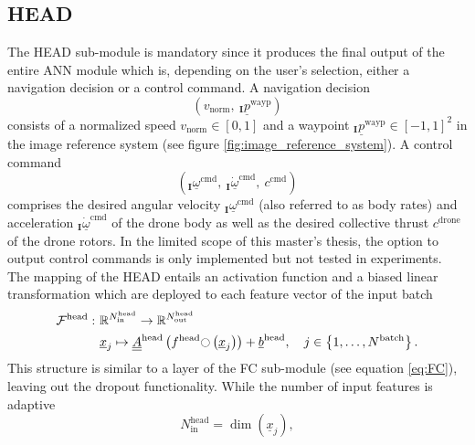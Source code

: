 \subsection*{HEAD}
The HEAD sub-module is mandatory
since it produces 
the final output of the entire ANN module
which is,
depending on the user's selection,
either a navigation decision
or a control command.
A navigation decision 
\begin{equation} \label{eq:navigation_decision}
    (
        v_\text{norm},
        \ 
        {}_\textbf{I} \underline p^\text{wayp}
    )   
\end{equation}
consists of a normalized speed 
$v_\text{norm} \in [0, 1]$
and a waypoint
${}_\textbf{I} \underline p^\text{wayp} \in [-1, 1]^2$
in the image reference system
(see figure \ref{fig:image_reference_system}).
A control command 
\begin{equation}
    (
        {}_\textbf{I} \underline \omega^\text{cmd},\ 
        {}_\textbf{I} \underline{\dot\omega}^\text{cmd},\ 
        c^\text{cmd}
    )
\end{equation}
comprises the desired angular velocity
${}_\textbf{I} \underline \omega^\text{cmd}$
(also referred to as body rates)
and acceleration
$
{}_\textbf{I} \underline{\dot\omega}^\text{cmd}
$
of the drone body
as well as the desired collective thrust 
$c^\text{drone}$
of the drone rotors.
In the limited scope of this master's thesis,
the option to output control commands
is only implemented but not tested in experiments.
The mapping of the HEAD entails 
an activation function and a biased linear transformation
which are deployed to each feature vector
of the input batch
\begin{align} \label{eq:head}
    \mathcal{F}^\text{head}
    :\ &
    \mathbb{R}^{
        N^\text{head}_\text{in}
    }
    \rightarrow 
    \mathbb{R}^{
            N^\text{head}_\text{out}
        }
    \nonumber \\ &
    \underline{x}_j
    \mapsto
    \underline{\underline A}^\text{head}
    \left(
        f^\text{head} \fullmoon \left(
            \underline{x}_j
        \right)
    \right)
    + \underline b^\text{head}
    ,\quad
    j
    \in 
    \left\{
        1, \dots, N^\text{batch}
    \right\}
    .
\end{align}
This structure is similar to a layer of the FC sub-module
(see equation \ref{eq:FC}),
leaving out the dropout functionality.
While the number of input features is adaptive
\begin{equation}
    N^\text{head}_\text{in}
    =
    \dim \left(
        \underline{x}_j
    \right),
\end{equation}
